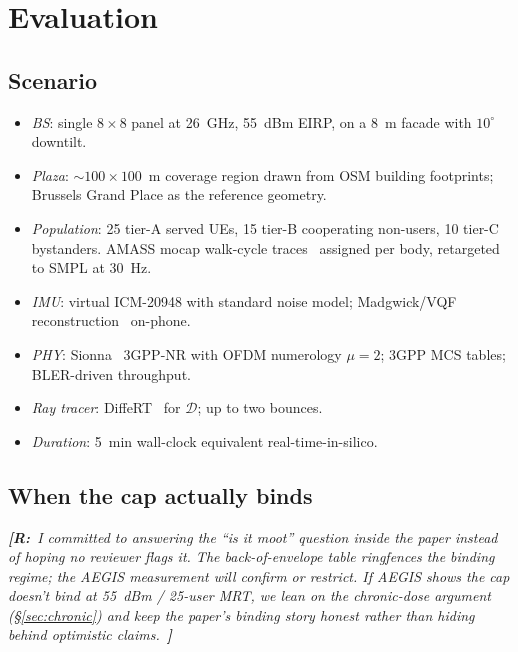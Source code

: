 \documentclass[journal,twocolumn,10pt]{IEEEtran}
\theoremstyle{definition}
\newcommand{\robinnote}[1]{%
  {\color{red!75!black}\textit{\textbf{[R:}~#1~\textbf{]}}}}
\newcommand{\Dict}{\mathcal{D}}
\begin{document}
\section{Evaluation}\label{sec:eval}

\subsection{Scenario}\label{sec:scene}

\begin{itemize}
\item \emph{BS}: single $8\times 8$ panel at 26~GHz, 55~dBm EIRP,
  on a 8~m facade with $10^{\circ}$ downtilt.
\item \emph{Plaza}: $\sim 100\times 100$~m coverage region drawn
  from OSM building footprints; Brussels Grand Place as the
  reference geometry.
\item \emph{Population}: 25 tier-A served UEs, 15 tier-B
  cooperating non-users, 10 tier-C bystanders. AMASS mocap
  walk-cycle traces~\cite{AMASS} assigned per body, retargeted
  to SMPL at 30~Hz.
\item \emph{IMU}: virtual ICM-20948 with standard noise model;
  Madgwick/VQF reconstruction~\cite{Madgwick2011,VQF2022} on-phone.
\item \emph{PHY}: Sionna~\cite{Sionna} 3GPP-NR with OFDM
  numerology $\mu=2$; 3GPP MCS tables; BLER-driven throughput.
\item \emph{Ray tracer}: DiffeRT~\cite{DiffeRT} for $\Dict$; up to
  two bounces.
\item \emph{Duration}: 5~min wall-clock equivalent real-time-in-silico.
\end{itemize}

\subsection{When the cap actually binds}\label{sec:binding}

\robinnote{I committed to answering the ``is it moot'' question
inside the paper instead of hoping no reviewer flags it. The
back-of-envelope table ringfences the binding regime; the
AEGIS measurement will confirm or restrict. If AEGIS shows the
cap doesn't bind at 55~dBm / 25-user MRT, we lean on the
chronic-dose argument (\S\ref{sec:chronic}) and keep the
paper's binding story honest rather than hiding behind
optimistic claims.}
\end{document}
